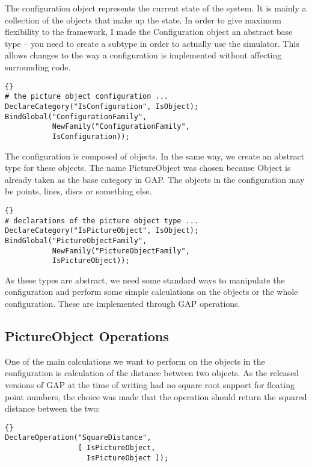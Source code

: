 \documentclass[12pt,a4paper]{book}  %
\begin{document}
The configuration object represents the current state of the system.
It is mainly a collection of the objects that make up the state.  In
order to give maximum flexibility to the framework, I made the
Configuration object an abstract base type -- you need to create a
subtype in order to actually use the simulator.  This allows changes
to the way a configuration is implemented without affecting
surrounding code.

\begin{lstlisting}{}
# the picture object configuration ...
DeclareCategory("IsConfiguration", IsObject);
BindGlobal("ConfigurationFamily",
           NewFamily("ConfigurationFamily",
           IsConfiguration));
\end{lstlisting}

The configuration is composed of objects.  In the same way, we create
an abstract type for these objects.  The name PictureObject was chosen
because Object is already taken as the base category in GAP.  The
objects in the configuration may be points, lines, discs or something
else.

\begin{lstlisting}{}
# declarations of the picture object type ...
DeclareCategory("IsPictureObject", IsObject);
BindGlobal("PictureObjectFamily",
           NewFamily("PictureObjectFamily",
           IsPictureObject));
\end{lstlisting}

As these types are abstract, we need some standard ways to manipulate
the configuration and perform some simple calculations on the objects
or the whole configuration.  These are implemented through GAP
operations.

\subsection{PictureObject Operations}

One of the main calculations we want to perform on the objects in the
configuration is calculation of the distance between two objects.
As the released versions of GAP at the time of writing had no square
root support for floating point numbers, the choice was made that the
operation should return the squared distance between the two:

\begin{lstlisting}{}
DeclareOperation("SquareDistance",
                 [ IsPictureObject,
                   IsPictureObject ]);
\end{lstlisting}
\end{document}
